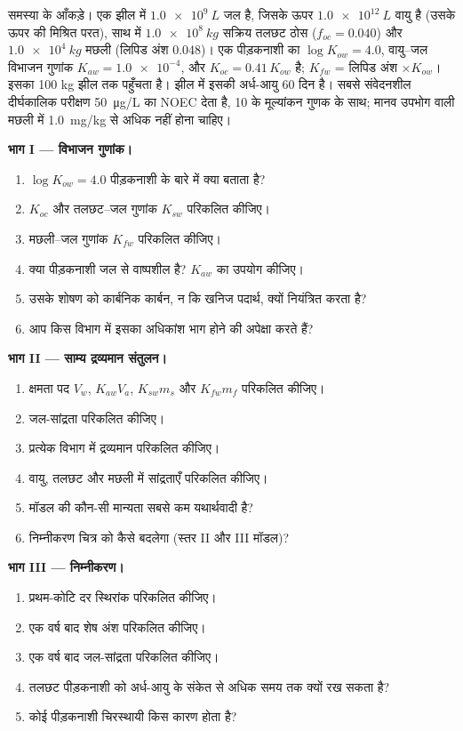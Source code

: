 \begin{problem}
\label{pb:b3:environmental-toxicology:1}
समस्या के आँकड़े। एक झील में $\qty{1.0e9}{L}$ जल है, जिसके ऊपर $\qty{1.0e12}{L}$ वायु है (उसके ऊपर की मिश्रित परत),
साथ में $\qty{1.0e8}{kg}$ सक्रिय तलछट ठोस ($f_{oc} = 0.040$) और $\qty{1.0e4}{kg}$ मछली (लिपिड अंश 0.048)।
एक पीड़कनाशी का $\log K_{ow} = 4.0$, वायु--जल विभाजन गुणांक $K_{aw} = \num{1.0e-4}$, और $K_{oc} = 0.41\,K_{ow}$ है;
$K_{fw}$ = लिपिड अंश $\times K_{ow}$। इसका 100 kg झील तक पहुँचता है। झील में इसकी अर्ध-आयु 60 दिन है।
सबसे संवेदनशील दीर्घकालिक परीक्षण \qty{50}{\micro g/L} का NOEC देता है, 10 के मूल्यांकन गुणक के साथ;
मानव उपभोग वाली मछली में \qty{1.0}{mg/kg} से अधिक नहीं होना चाहिए।

\medskip\noindent\textbf{भाग I --- विभाजन गुणांक।}
\begin{enumerate}
  \item $\log K_{ow} = 4.0$ पीड़कनाशी के बारे में क्या बताता है?
  \item $K_{oc}$ और तलछट--जल गुणांक $K_{sw}$ परिकलित कीजिए।
  \item मछली--जल गुणांक $K_{fw}$ परिकलित कीजिए।
  \item क्या पीड़कनाशी जल से वाष्पशील है? $K_{aw}$ का उपयोग कीजिए।
  \item उसके शोषण को कार्बनिक कार्बन, न कि खनिज पदार्थ, क्यों नियंत्रित करता है?
  \item आप किस विभाग में इसका अधिकांश भाग होने की अपेक्षा करते हैं?
\end{enumerate}

\medskip\noindent\textbf{भाग II --- साम्य द्रव्यमान संतुलन।}
\begin{enumerate}[resume]
  \item क्षमता पद $V_w$, $K_{aw}V_a$, $K_{sw}m_s$ और $K_{fw}m_f$ परिकलित कीजिए।
  \item जल-सांद्रता परिकलित कीजिए।
  \item प्रत्येक विभाग में द्रव्यमान परिकलित कीजिए।
  \item वायु, तलछट और मछली में सांद्रताएँ परिकलित कीजिए।
  \item मॉडल की कौन-सी मान्यता सबसे कम यथार्थवादी है?
  \item निम्नीकरण चित्र को कैसे बदलेगा (स्तर II और III मॉडल)?
\end{enumerate}

\medskip\noindent\textbf{भाग III --- निम्नीकरण।}
\begin{enumerate}[resume]
  \item प्रथम-कोटि दर स्थिरांक परिकलित कीजिए।
  \item एक वर्ष बाद शेष अंश परिकलित कीजिए।
  \item एक वर्ष बाद जल-सांद्रता परिकलित कीजिए।
  \item तलछट पीड़कनाशी को अर्ध-आयु के संकेत से अधिक समय तक क्यों रख सकता है?
  \item कोई पीड़कनाशी चिरस्थायी किस कारण होता है?
\end{enumerate}


\end{problem}
